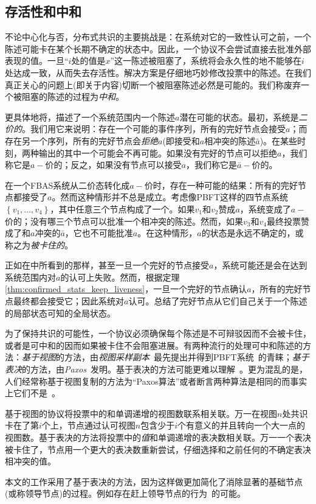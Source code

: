 \subsection{存活性和中和}\label{sec:vote_stuck}

不论中心化与否，分布式共识的主要挑战是：在系统对它的一致性认可之前，一个陈述可能卡在某个长期不确定的状态中。因此，一个协议不会尝试直接去批准外部表现的值。一旦``{\slot}$i$处的值是$x$''这一陈述被阻塞了，系统将会永久性的地不能够在{\slot}$i$处达成一致，从而失去存活性。解决方案是仔细地巧妙修改投票中的陈述。在我们真正关心的问题上(即关于{\slot}内容)切断一个被阻塞陈述必然是可能的。我们称废弃一个被阻塞的陈述的过程为\textit{中和}。

更具体地将，描述了一个系统范围内一个陈述$a$潜在可能的状态。最初，系统是\textit{二价的}。我们用它来说明：存在一个可能的事件序列，所有的完好节点会接受$a$；而存在另一个序列，所有的完好节点会\textit{拒绝}$a$(即接受和$a$相冲突的陈述$\bar a$)。在某些时刻，两种输出的其中一个可能会不再可能。如果没有完好的节点可以拒绝$a$，我们称它是$a-\!\!$价的；反之，如果没有节点可以接受$a$，我们称它是$\bar a-\!\!$价的。

在一个FBAS系统从二价态转化成$a-\!\!$价时，存在一种可能的结果：所有的完好节点都接受了$a$。然而这种情形并不总是成立。考虑像PBFT这样的四节点系统$\left\{v_1,\ldots,v_4\right\}$，其中任意三个节点构成了一个{\quorum}。如果$v_1$和$v_2$赞成$a$，系统变成了$a-\!\!$价的；没有哪三个节点可以批准一个相冲突的陈述。然而，如果$v_3$和$v_4$最终投票赞成了和$a$冲突的$\bar a$，它也不可能批准$a$。在这种情形，$a$的状态是永远不确定的，或称之为\textit{被卡住的}。

正如在中所看到的那样，甚至一旦一个完好的节点接受$a$，系统可能还是会在达到系统范围内对$a$的认可上失败。然而，根据定理\ref{thm:confirmed_stats_keep_liveness}，一旦一个完好的节点确认$a$，所有的完好节点最终都会接受它；因此系统对$a$认可。总结了完好节点从它们自己关于一个陈述的局部状态可知的全局状态。

为了保持共识的可能性，一个协议必须确保每个陈述是不可辩驳因而不会被卡住，或者是可中和的因而如果被卡住不会阻塞进展。有两种流行的处理可中和陈述的方法：\textit{基于视图}的方法，由\textit{视图采样副本}~\cite{Oki:1988:VRN:62546.62549}最先提出并得到PBFT系统~\cite{Castro:1999:PBFT}的青睐；\textit{基于表决}的方法，由\textit{Paxos}~\cite{Lamport:1998:PP:279227.279229}发明。基于表决的方法可能更难以理解~\cite{Ongaro:2014:SUC:2643634.2643666}。更为混乱的是，人们经常称基于视图复制的方法为``Paxos算法''或者断言两种算法是相同的而事实上它们不是~\cite{6894199}。

基于视图的协议将投票中的{\slot}和单调递增的视图数联系相关联。万一在视图$n$处共识卡在了第$i$个{\slot}上，节点通过认可视图$n$包含少于$i$个有意义的{\slot}并且转向一个大一点的视图数。基于表决的方法将投票中的\textit{值}和单调递增的表决数相关联。万一一个表决被卡住了，节点用一个更大的表决数重新尝试，仔细选择和之前任何的不确定表决相冲突的值。

本文的工作采用了基于表决的方法，因为这样做更加简化了消除显著的基础节点(或称领导节点)的过程。例如存在赶上领导节点的行为~\cite{Lamport:2011:BPR:2075029.2075058}的可能。
